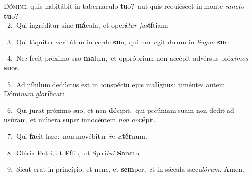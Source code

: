 \lettrine{\initial\textcolor{\initialcolor}{D}}{ómine,} quis habitábit in tabernáculo \textbf{tu}\-o?~\star aut quis requiéscet in monte \textit{sanc}\-\textit{to} \textbf{tu}\-o?\\
{\numbfont\textcolor{\numbcolor}{~2.}}~Qui ingréditur sine \textbf{má}\-cula,~\star et operá\textit{tur} \textit{jus}\-\textbf{tí}tiam:\par
{\numbfont\textcolor{\numbcolor}{~3.}}~Qui lóquitur veritátem in corde \textbf{su}\-o,~\star qui non egit dolum in \textit{lin}\-\textit{gua} \textbf{su}\-a:\par
{\numbfont\textcolor{\numbcolor}{~4.}}~Nec fecit próximo suo \textbf{ma}\-lum,~\star et oppróbrium non accépit advérsus pró\-\textit{xi}\-\textit{mos} \textbf{su}\-os.\par
{\numbfont\textcolor{\numbcolor}{~5.}}~Ad níhilum dedúctus est in conspéctu ejus ma\-\textbf{lí}\-gnus:~\star timéntes autem Dómi\textit{num} \textit{glo}\-\textbf{rí}ficat:\par
{\numbfont\textcolor{\numbcolor}{~6.}}~Qui jurat próximo suo, et non \textbf{dé}\-cipit,~\star qui pecúniam suam non dedit ad usúram, et múnera super innocéntem \textit{non} \textit{ac}\-\textbf{cé}pit.\par
{\numbfont\textcolor{\numbcolor}{~7.}}~Qui \textbf{fa}\-cit hæc:~\star non movébitur \textit{in} \textit{æ}\-\textbf{tér}num.\par
{\numbfont\textcolor{\numbcolor}{~8.}}~Glória Patri, et \textbf{Fí}\-lio,~\star et Spirí\-\textit{tu}\-\textit{i} \textbf{Sanc}\-to.\par
{\numbfont\textcolor{\numbcolor}{~9.}}~Sicut erat in princípio, et nunc, et \textbf{sem}\-per,~\star et in sǽcula sæcu\-\textit{ló}\-\textit{rum}. \textbf{A}\-men.\par
